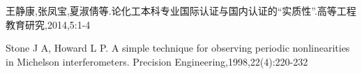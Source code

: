 \documentclass[11pt,a4paper]{article}
\newcommand{\wuhao}{\fontsize{10.5pt}{18pt}\selectfont}
\newcommand\seccontent{
	\wuhao %
    \setlength{\parindent}{2em} %
    \setlength{\parskip}{0pt}
    }
\theoremstyle{definition} \newtheorem{law}[thm]{Law}
\theoremstyle{plain} \newtheorem{jury}[thm]{Jury}
\theoremstyle{remark} \newtheorem*{marg}{Margaret}
\numberwithin{equation}{section}
\begin{document}
\appendix
{}
\label{bibtexref}

\begin{thebibliography}{1}
	\label{latexref}
	\seccontent
	 王静康,张凤宝,夏淑倩等.论化工本科专业国际认证与国内认证的“实质性”.高等工程教育研究,2014,5:1-4

	 Stone J A, Howard L P. A simple technique for observing periodic nonlinearities in Michelson interferometers. Precision Engineering,1998,22(4):220-232

\end{thebibliography}
%	
\end{document}
